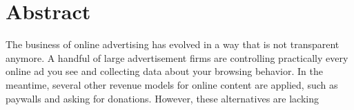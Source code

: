 \chapter*{Abstract}
\label{cha:abstract}
The business of online advertising has evolved in a way that is not transparent anymore. A handful of large advertisement firms are controlling practically every online ad you see and collecting data about your browsing behavior. In the meantime, several other revenue models for online content are applied, such as paywalls and asking for donations. However, these alternatives are lacking 

